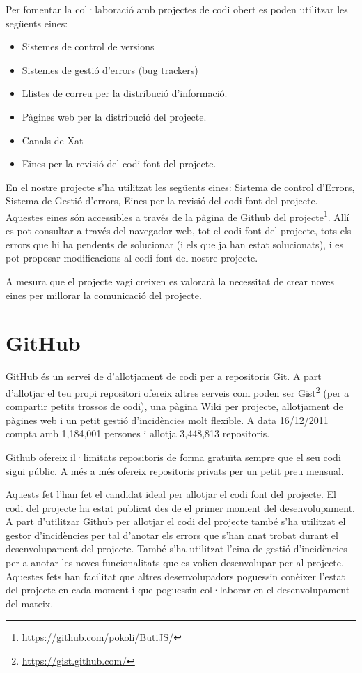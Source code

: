 Per fomentar la col·laboració amb projectes de codi obert es poden utilitzar les següents eines: 

\begin{itemize}
\item{Sistemes de control de versions}
\item{Sistemes de gestió d'errors (bug trackers)}
\item{Llistes de correu per la distribució d'informació.}
\item{Pàgines web per la distribució del projecte.}
\item{Canals de Xat}
\item{Eines per la revisió del codi font del projecte.}
\end{itemize}

En el nostre projecte s'ha utilitzat les següents eines: Sistema de control d'Errors, Sistema de Gestió d'errors, Eines per la revisió del codi font del projecte. Aquestes eines són accessibles a través de la pàgina de Github del projecte\footnote{\url{https://github.com/pokoli/ButiJS/}}. Allí es pot consultar a través del navegador web, tot el codi font del projecte, tots els errors que hi ha pendents de solucionar (i els que ja han estat solucionats), i es pot proposar modificacions al codi font del nostre projecte. 

A mesura que el projecte vagi creixen es valorarà la necessitat de crear noves eines per millorar la comunicació del projecte. 

\section{GitHub}

GitHub és un servei de d'allotjament de codi per a repositoris Git. A part d'allotjar el teu propi repositori ofereix altres serveis com poden ser Gist\footnote{\url{https://gist.github.com/}} (per a compartir petits trossos de codi), una pàgina Wiki per projecte, allotjament de pàgines web i un petit gestió d'incidències molt flexible. A data 16/12/2011 compta amb 1,184,001 persones i allotja 3,448,813 repositoris.

Github ofereix il·limitats repositoris de forma gratuïta sempre que el seu codi sigui públic. A més a més ofereix repositoris privats per un petit preu mensual. 

Aquests fet l'han fet el candidat ideal per allotjar el codi font del projecte. El codi del projecte ha estat publicat des de el primer moment del desenvolupament. A part d'utilitzar Github per allotjar el codi del projecte també s'ha utilitzat el gestor d'incidències per tal d'anotar els errors que s'han anat trobat durant el desenvolupament del projecte. També s'ha utilitzat l'eina de gestió d'incidències per a anotar les noves funcionalitats que es volien desenvolupar per al projecte. Aquestes fets han facilitat que altres desenvolupadors poguessin conèixer l'estat del projecte en cada moment i que poguessin col·laborar en el desenvolupament del mateix. 

